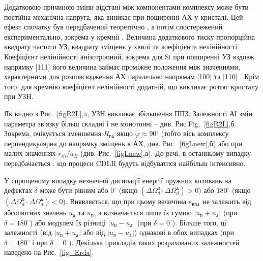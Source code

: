 Додатковою причиною зміни відстані між компонентами комплексу може бути постійна механічна напруга,
яка виникає при поширенні АХ у кристалі.
Цей ефект спочатку був передбачений теоретично \cite{Thurston,StaticStrain:PhysRevB30I}, а потім
спостережений експериментально, зокрема у кремнії \cite{StaticStrain:PhysRevB30II}.
Величина додаткового тиску пропорційна квадрату частоти УЗ, квадрату зміщень у хвилі та коефіцієнта нелінійності\cite{StaticStrain:PhysRevB30II}.
Коефіцієнт нелінійності анізотропний, зокрема для Si при
поширенні УЗ вздовж напрямку [111] його величина займає проміжне положення між значеннями, характерними для розповсюдження АХ
паралельно напрямам [100] та [110] \cite{NelinSi}.
Крім того, для кремнію коефіцієнт нелінійності додатній, що викликає розтяг кристалу при УЗН.




Як видно з Рис.~\ref{figR2L},a, УЗН викликає збільшення ППЗ.
Залежності АІ змін параметра зв'язку більш складні і не монотонні -- див. Рис.Fig.~\ref{figR2L},б.
Зокрема, очікується  зменшення $R_{\mathtt{DA}}$ якщо $\varphi\approx90^\circ$ (тобто вісь комплексу перпендикулярна до напрямку зміщень в АХ, див. Рис.~\ref{figLnew},б)
або при малих значеннях $r_{in}/a_B$ (див. Рис.~\ref{figLnew},а).
До речі, в останньому випадку передбачається \cite{CDLR:JAP1995,CDLR:JAP}, що процеси CDLR будуть відбуватися найбільш інтенсивно.

У спрощеному випадку незначної дисипації енергії пружних коливань на дефектах
$\delta$ може бути рівним або $0^\circ$ (якщо $(\Delta\Omega_d^\mathtt{D}\cdot\Delta\Omega_d^\mathtt{A})>0$)
або $180^\circ$ (якщо $(\Delta\Omega_d^\mathtt{D}\cdot\Delta\Omega_d^\mathtt{A})<0$).
Виявляється, що при цьому величина $\varepsilon_{\mathtt{RDA}}$ не залежить від абсолютних значень $u_\mathtt{A}$ та $u_\mathtt{D}$,
а визначається лише їх сумою $|u_\mathtt{D}+u_\mathtt{A}|$ (при $\delta=180^\circ$)
або модулем їх різниці $|u_\mathtt{D}-u_\mathtt{A}|$ (при $\delta=0^\circ$).
Більше того, ці залежності (від $|u_\mathtt{D}+u_\mathtt{A}|$ або від $|u_\mathtt{D}-u_\mathtt{A}|$) однакові в обох випадках
(при $\delta=180^\circ$ і при $\delta=0^\circ$).
Декілька прикладів таких розрахованих залежностей наведено на Рис.~\ref{fig_Erda}.

